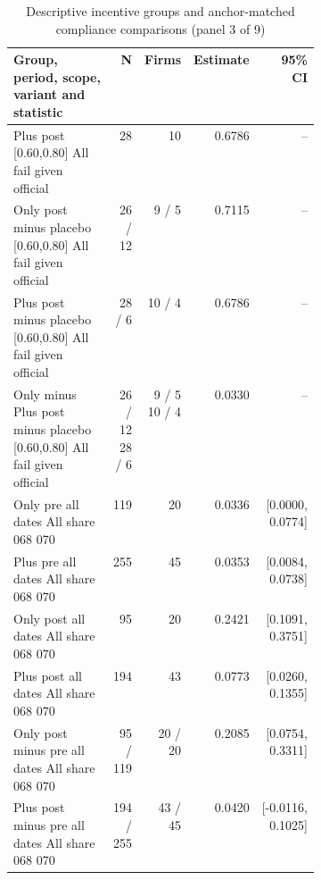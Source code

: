 \begin{table}[!htbp]\centering\scriptsize
\caption{Descriptive incentive groups and anchor-matched compliance comparisons (panel 3 of 9)}
\begin{threeparttable}
\begin{tabular}{p{0.40\linewidth}rrrr}
\toprule
Group, period, scope, variant and statistic & N & Firms & Estimate & 95\% CI \\
\midrule
Plus post [0.60,0.80] All fail given official & 28 & 10 & 0.6786 & -- \\
Only post minus placebo [0.60,0.80] All fail given official & 26 / 12 & 9 / 5 & 0.7115 & -- \\
Plus post minus placebo [0.60,0.80] All fail given official & 28 / 6 & 10 / 4 & 0.6786 & -- \\
Only minus Plus post minus placebo [0.60,0.80] All fail given official & \shortstack{26 / 12\\28 / 6} & \shortstack{9 / 5\\10 / 4} & 0.0330 & -- \\
Only pre all dates All share 068 070 & 119 & 20 & 0.0336 & [0.0000, 0.0774] \\
Plus pre all dates All share 068 070 & 255 & 45 & 0.0353 & [0.0084, 0.0738] \\
Only post all dates All share 068 070 & 95 & 20 & 0.2421 & [0.1091, 0.3751] \\
Plus post all dates All share 068 070 & 194 & 43 & 0.0773 & [0.0260, 0.1355] \\
Only post minus pre all dates All share 068 070 & 95 / 119 & 20 / 20 & 0.2085 & [0.0754, 0.3311] \\
Plus post minus pre all dates All share 068 070 & 194 / 255 & 43 / 45 & 0.0420 & [-0.0116, 0.1025] \\
\bottomrule
\end{tabular}
\begin{tablenotes}[flushleft]\footnotesize

\end{tablenotes}
\end{threeparttable}
\end{table}

